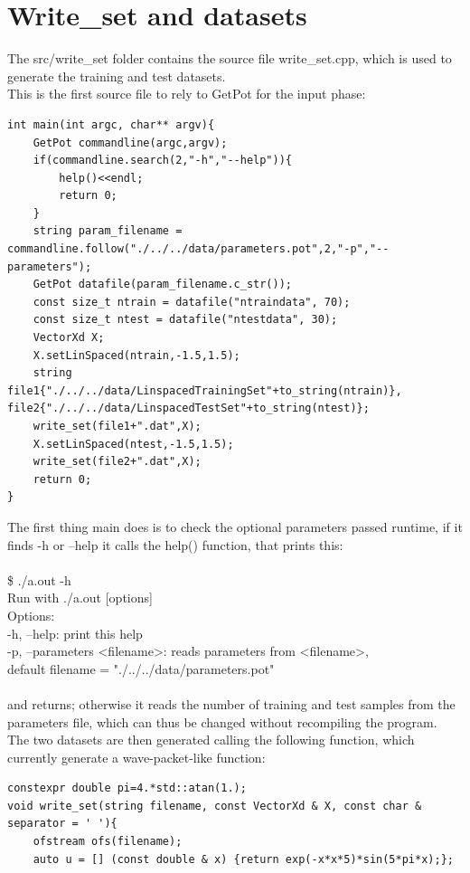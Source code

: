 \documentclass[12pt, a4paper]{report}
\theoremstyle{definition}
\begin{document}
{\section{Write\_set and datasets}\label{section3.4}
The src/write\_set folder contains the source file write\_set.cpp, which is used to generate the training and test datasets.\\
This is the first source file to rely to GetPot for the input phase:
\begin{lstlisting}[frame=single, showstringspaces=false]
int main(int argc, char** argv){
	GetPot commandline(argc,argv);
	if(commandline.search(2,"-h","--help")){
		help()<<endl;
		return 0;
	}
	string param_filename = commandline.follow("./../../data/parameters.pot",2,"-p","--parameters");
	GetPot datafile(param_filename.c_str());
	const size_t ntrain = datafile("ntraindata", 70);
	const size_t ntest = datafile("ntestdata", 30);
	VectorXd X;
	X.setLinSpaced(ntrain,-1.5,1.5);
	string file1{"./../../data/LinspacedTrainingSet"+to_string(ntrain)}, file2{"./../../data/LinspacedTestSet"+to_string(ntest)};
	write_set(file1+".dat",X);
	X.setLinSpaced(ntest,-1.5,1.5);
	write_set(file2+".dat",X);
	return 0;
}
\end{lstlisting}
The first thing {\ttfamily main} does is to check the optional parameters passed runtime, if it finds {\ttfamily -h} or {\ttfamily --help} it calls the  help() function, that prints this:\\
{\\\ttfamily \$ ./a.out -h  \\
Run with ./a.out [options]\\
Options:\\
-h, --help: print this help\\
-p, --parameters <filename>: reads parameters from <filename>,\\
          default filename = "./../../data/parameters.pot"\\\\}
and returns; otherwise it reads the number of training and test samples from the parameters file, which can thus be changed without recompiling the program. The two datasets are then generated calling the following function, which currently generate a wave-packet-like function:
\begin{lstlisting}[frame=single, showstringspaces=false]
constexpr double pi=4.*std::atan(1.);
void write_set(string filename, const VectorXd & X, const char & separator = ' '){
	ofstream ofs(filename);
	auto u = [] (const double & x) {return exp(-x*x*5)*sin(5*pi*x);};	

\end{lstlisting}}
\end{document}
